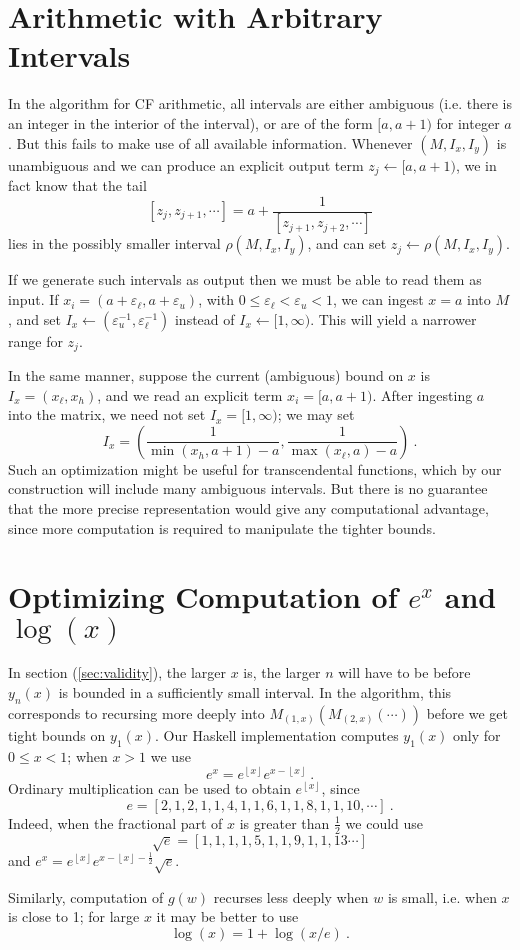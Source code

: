 \documentclass[11pt, oneside]{amsart}   	%
\renewcommand{\:}{\negthickspace:\negthickspace}
\begin{document}
\section{Arithmetic with Arbitrary Intervals}
In the algorithm for CF arithmetic, all intervals are either ambiguous (i.e. there is an integer in the interior of the interval), or are of the form $[a,a+1)$ for integer $a$. But this fails to make use of all available information.
Whenever $(M,I_x, I_y)$ is unambiguous and we can produce an explicit output term $z_j \leftarrow [a,a+1)$, we in fact know that the tail 
\[
[z_j, z_{j+1},\cdots] = a + \frac{1}{[z_{j+1}, z_{j+2},\cdots]}
\]
lies in the possibly smaller interval $\rho(M,I_x, I_y)$, and can set $z_j \leftarrow \rho(M,I_x, I_y)$.

If we generate such intervals as output then we must be able to read them as input. If $x_i = (a+\varepsilon_\ell, a+\varepsilon_u)$, with $0 \leq \varepsilon_\ell < \varepsilon_u <1$, we can ingest $x=a$ into $M$, and set $I_x \leftarrow (\varepsilon_u^{-1}, \varepsilon_\ell^{-1})$ instead of $I_x \leftarrow [1,\infty)$. This will yield a narrower range for $z_j$.

In the same manner, suppose the current (ambiguous) bound on $x$ is $I_x = (x_{\ell}, x_{h})$, and we read an explicit term $x_i = [a,a+1)$. After ingesting $a$ into the matrix, we need not set $I_x = [1,\infty)$; we may set
\[
I_x = \left(\frac{1}{\min(x_h,a+1) - a}, \frac{1}{\max(x_{\ell},a) - a}\right) \ .
\]
Such an optimization might be useful for transcendental functions, which by our construction will include many ambiguous intervals. But there is no guarantee that the more precise representation would give any computational advantage, since more computation is required to manipulate the tighter bounds.


\section{Optimizing Computation of $e^x$ and $\log(x)$}
In section (\ref{sec:validity}), the larger $x$ is, the larger $n$ will have to be before $y_n(x)$ is bounded in  a sufficiently small interval. In the algorithm, this corresponds to recursing more deeply into $M_{(1,x)}( M_{(2,x)}( \cdots ) )$ before we get tight bounds on $y_1(x)$. Our Haskell implementation computes $y_1(x)$ only for $0 \leq x < 1$; when $x>1$ we use
\[
e^x = e^{\left\lfloor x \right\rfloor}e^{x - \left\lfloor x \right\rfloor} \ .
\]
Ordinary multiplication can be used to obtain $e^{\left\lfloor x \right\rfloor}$, since
\[
e = [2,1,2,1,1,4,1,1,6,1,1,8,1,1,10,\cdots] \ .
\]
Indeed, when the fractional part of $x$ is greater than $\frac{1}{2}$ we could use
\[
\sqrt{e} = [1,1,1,1,5,1,1,9,1,1,13\cdots]
\]
and $e^x = e^{\left\lfloor x \right\rfloor }e^{x - \left\lfloor x \right\rfloor- \frac{1}{2}}\sqrt{e}$.

Similarly, computation of $g(w)$ recurses less deeply when $w$ is small, i.e. when $x$ is close to 1; for large $x$ it may be better to use
\[
\log(x) = 1 + \log(x/e) \ .
\]



\end{document}
